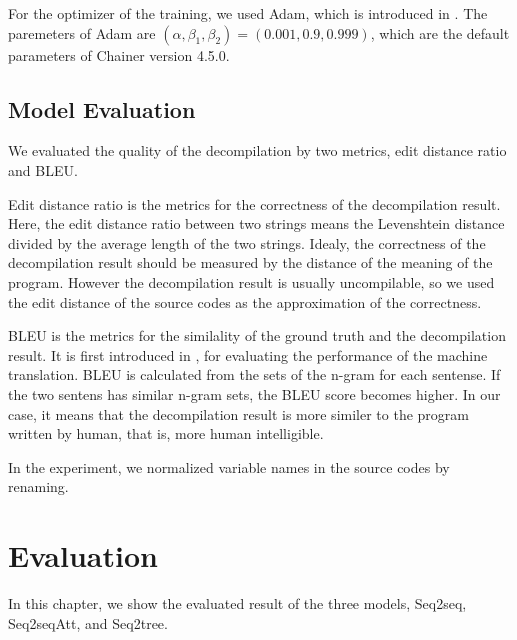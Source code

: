 \documentclass[senior,final,11pt]{iscs-thesis}
\begin{document}
For the optimizer of the training, we used Adam, which is introduced in \cite{Adam}.
The paremeters of Adam are $ (\alpha,\beta_1,\beta_2) = (0.001,0.9,0.999) $, which are the default parameters of Chainer version 4.5.0.

\section{Model Evaluation}
We evaluated the quality of the decompilation by two metrics, edit distance ratio and BLEU.

Edit distance ratio is the metrics for the correctness of the decompilation result.
Here, the edit distance ratio between two strings means the Levenshtein distance divided by the average length of the two strings.
Idealy, the correctness of the decompilation result should be measured by the distance of the meaning of the program.
However the decompilation result is usually uncompilable, so we used the edit distance of the source codes as the approximation of the correctness.

BLEU is the metrics for the similality of the ground truth and the decompilation result. 
It is first introduced in \cite{BLEU}, for evaluating the performance of the machine translation.
BLEU is calculated from the sets of the n-gram for each sentense. 
If the two sentens has similar n-gram sets, the BLEU score becomes higher.
In our case, it means that the decompilation result is more similer to the program written by human, that is, more human intelligible.


In the experiment, we normalized variable names in the source codes by renaming. 

\chapter{Evaluation}
In this chapter, we show the evaluated result of the three models, Seq2seq, Seq2seqAtt, and Seq2tree.
\end{document}
